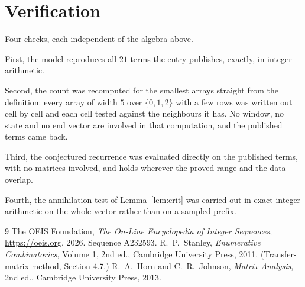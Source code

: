 \documentclass[11pt,a4paper]{article}
\theoremstyle{plain}
\theoremstyle{definition}
\begin{document}
\section{Verification}

Four checks, each independent of the algebra above.

First, the model reproduces all $21$ terms the entry publishes, exactly, in integer
arithmetic.

Second, the count was recomputed for the smallest arrays straight from the definition: every
array of width $5$ over $\{0,1,2\}$ with a few rows was written out cell by cell and each cell
tested against the neighbours it has. No window, no state and no end vector are involved in that
computation, and the published terms came back.

Third, the conjectured recurrence was evaluated directly on the published terms, with no
matrices involved, and holds wherever the proved range and the data overlap.

Fourth, the annihilation test of Lemma~\ref{lem:crit} was carried out in exact integer
arithmetic on the whole vector rather than on a sampled prefix.

\begin{thebibliography}{9}
 The OEIS Foundation, \emph{The On-Line Encyclopedia of Integer
Sequences}, \url{https://oeis.org}, 2026. Sequence A232593.
 R.~P.~Stanley, \emph{Enumerative Combinatorics}, Volume 1, 2nd ed.,
Cambridge University Press, 2011. (Transfer-matrix method, Section 4.7.)
 R.~A.~Horn and C.~R.~Johnson, \emph{Matrix Analysis}, 2nd ed., Cambridge
University Press, 2013.
\end{thebibliography}
\end{document}
